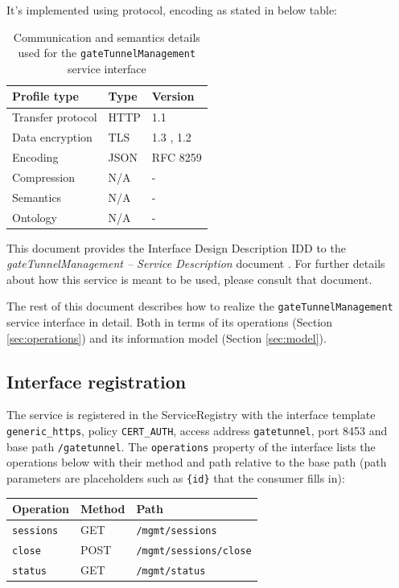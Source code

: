 \documentclass[a4paper]{arrowhead}
\begin{document}
It's implemented using protocol, encoding as stated in below table:
\begin{table}[ht!]
  \centering
  \begin{tabular}{|l|l|l|}
    \hline
    \rowcolor{gray!33} Profile type & Type & Version \\ \hline
    Transfer protocol & HTTP & 1.1 \cite{rfc9112} \\ \hline
    Data encryption & TLS & 1.3 \cite{rfc8446}, 1.2 \cite{rfc5246} \\ \hline
    Encoding & JSON & RFC 8259 \cite{rfc8259} \\ \hline
    Compression & N/A & - \\ \hline
    Semantics & N/A & - \\ \hline
    Ontology & N/A & - \\ \hline
  \end{tabular}
  \caption{Communication and semantics details used for the \texttt{gate\allowbreak{}Tunnel\allowbreak{}Management} service interface}
  \label{tab:comunication_semantics_profile}
\end{table}

This document provides the Interface Design Description IDD to the \textit{gateTunnelManagement -- Service Description} document \cite{gt-gateTunnelManagement-sd}.
For further details about how this service is meant to be used, please consult that document.

The rest of this document describes how to realize the \texttt{gate\allowbreak{}Tunnel\allowbreak{}Management} service
interface in detail. Both in terms of its operations (Section \ref{sec:operations}) and its information model (Section \ref{sec:model}).

\subsection{Interface registration}

The service is registered in the ServiceRegistry with the interface template \texttt{generic\_\allowbreak{}https}, policy \texttt{CERT\_\allowbreak{}AUTH}, access address \texttt{gatetunnel}, port 8453 and base path \texttt{/\allowbreak{}gatetunnel}. The \texttt{operations} property of the interface lists the operations below with their method and path relative to the base path (path parameters are placeholders such as \texttt{\{id\}} that the consumer fills in):

\noindent\begin{longtable}{| p{5.2cm} | p{1.6cm} | p{8.4cm} |} \hline
\rowcolor{gray!33} Operation & Method & Path \\ \hline \endhead
\texttt{sessions} & GET & \texttt{/\allowbreak{}mgmt/\allowbreak{}sessions} \\ \hline
\texttt{close} & POST & \texttt{/\allowbreak{}mgmt/\allowbreak{}sessions/\allowbreak{}close} \\ \hline
\texttt{status} & GET & \texttt{/\allowbreak{}mgmt/\allowbreak{}status} \\ \hline
\end{longtable}
\end{document}
